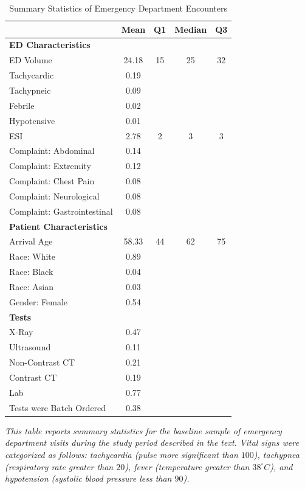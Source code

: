 \documentclass[,,nonblindrev]{informs}
\begin{document}
\begin{table}[ht]
\centering
\caption{Summary Statistics of Emergency Department Encounters}
\label{tab:summary_statistics}
\begin{tabular}{p{10.5cm}cccc}
\toprule
\textbf{} & \textbf{Mean} & \textbf{Q1} & \textbf{Median} & \textbf{Q3} \\
\midrule
\multicolumn{5}{l}{\textbf{ED Characteristics}} \\
ED Volume & 24.18 & 15 & 25 & 32 \\
Tachycardic & 0.19 & & & \\
Tachypneic & 0.09 & & & \\
Febrile & 0.02 & & & \\
Hypotensive & 0.01 & & & \\ 
ESI & 2.78 & 2 & 3 & 3 \\
Complaint: Abdominal & 0.14 & & & \\
Complaint: Extremity & 0.12 & & & \\
Complaint: Chest Pain & 0.08 & & & \\
Complaint: Neurological & 0.08 & & & \\
Complaint: Gastrointestinal & 0.08 & & & \\
\midrule
\multicolumn{5}{l}{\textbf{Patient Characteristics}} \\
Arrival Age & 58.33 & 44 & 62 & 75 \\
Race: White & 0.89 & & & \\
Race: Black & 0.04 & & & \\
Race: Asian & 0.03 & & & \\
Gender: Female & 0.54 & & & \\
\midrule
\multicolumn{5}{l}{\textbf{Tests}} \\
X-Ray & 0.47 & & & \\
Ultrasound & 0.11 & & & \\
Non-Contrast CT & 0.21 & & & \\
Contrast CT & 0.19 & & & \\
Lab & 0.77 & & & \\
Tests were Batch Ordered & 0.38 & & & \\
\bottomrule
\end{tabular}
\begin{tablenotes}
\small
\item \textit{This table reports summary statistics for the baseline sample of emergency department visits during the study period described in the text. Vital signs were categorized as follows: tachycardia (pulse more significant than $100$), tachypnea (respiratory rate greater than $20$), fever (temperature greater than $38^\circ C$), and hypotension (systolic blood pressure less than $90$).}
\end{tablenotes}
\end{table}
\end{document}
